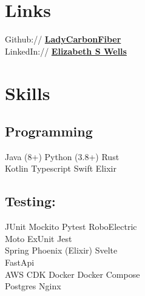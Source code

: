 \documentclass[a4paper]{deedy-resume-openfont} %
\begin{document}
\begin{minipage}[t]{0.33\textwidth}

\section{Links}

Github:// \href{https://github.com/ladycarbonfiber}{\bf LadyCarbonFiber } \\
LinkedIn:// \href{https://www.linkedin.com/in/elizabethswells/s}{\bf Elizabeth S Wells} \\




\sectionspace %


\section{Skills}

\subsection{Programming}
Java (8+) \textbullet{} Python (3.8+) \textbullet{} Rust \\
 Kotlin \textbullet{} Typescript \textbullet{} Swift \textbullet{} Elixir
\subsection {Testing:}
JUnit \textbullet{} Mockito \textbullet{} Pytest \textbullet{} RoboElectric \\ Moto \textbullet{} ExUnit \textbullet{} Jest\\
Spring \textbullet{} Phoenix (Elixir) \textbullet{} Svelte\\ \textbullet{} FastApi\\
AWS \textbullet{} CDK \textbullet{} Docker \textbullet{} Docker Compose \\
Postgres  \textbullet{} Nginx


\sectionspace %



\end{minipage}
\end{document}
